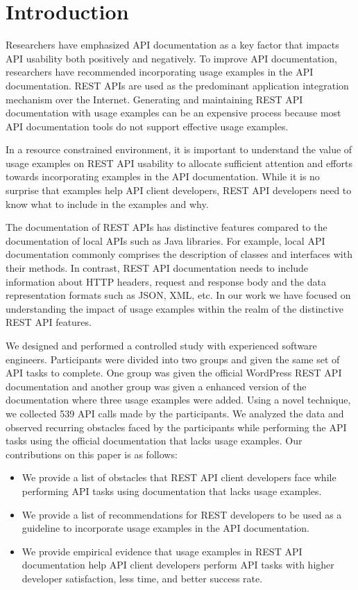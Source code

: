 \documentclass[conference]{IEEEtran}
\begin{document}
\IEEEpeerreviewmaketitle

\section{Introduction}
Researchers have emphasized API documentation as a key factor that impacts API usability both positively and negatively. To improve API documentation, researchers have recommended incorporating usage examples in the API documentation. REST APIs are used as the predominant application integration mechanism over the Internet. Generating and maintaining REST API documentation with usage examples can be an expensive process because most API documentation tools do not support effective usage examples.

In a resource constrained environment, it is important to understand the value of usage examples on REST API usability to allocate sufficient attention and efforts towards incorporating examples in the API documentation. While it is no surprise that examples help API client developers, REST API developers need to know what to include in the examples and why.

The documentation of REST APIs has distinctive features compared to the documentation of local APIs such as Java libraries. For example, local API documentation commonly comprises the description of classes and interfaces with their methods. In contrast, REST API documentation needs to include information about HTTP headers, request and response body and the data representation formats such as JSON, XML, etc. In our work we have focused on understanding the impact of usage examples within the realm of the distinctive REST API features.

We designed and performed a controlled study with experienced software engineers. Participants were divided into two groups and given the same set of API tasks to complete. One group was given the official WordPress REST API documentation and another group was given a enhanced version of the documentation where three usage examples were added. Using a novel technique, we collected 539 API calls made by the participants. We analyzed the data and observed recurring obstacles faced by the participants while performing the API tasks using the official documentation that lacks usage examples. Our contributions on this paper is as follows:

\begin{itemize}
  \item We provide a list of obstacles that REST API client developers face while performing API tasks using documentation that lacks usage examples.
  \item We provide a list of recommendations for REST developers to be used as a guideline to incorporate usage examples in the API documentation.
  \item We provide empirical evidence that usage examples in REST API documentation help API client developers perform API tasks with higher developer satisfaction, less time, and better success rate.
\end{itemize}
\end{document}
